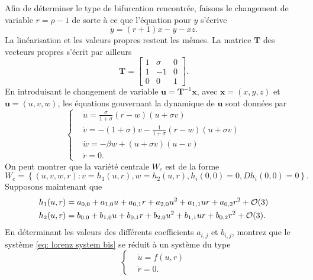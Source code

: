 \documentclass[12pt]{exam}
\begin{document}
\begin{questions}
\begin{parts}
\begin{subparts}
      \subpart[3] Afin de déterminer le type de bifurcation rencontrée, faisons le changement de variable $r = \rho - 1$ de sorte à ce que l'équation pour $y$ s'écrive
      $$
      \dot{y} = (r + 1)x - y - xz.
      $$
      La linéarisation et les valeurs propres restent les mêmes. La matrice $\bm{T}$ des vecteurs propres s'écrit par ailleurs
      $$
      \bm{T}  = \begin{bmatrix}
                    1 & \sigma & 0 \\
                    1 & -1 & 0 \\
                    0 & 0 & 1
                \end{bmatrix}.
      $$
      En introduisant le changement de variable $\bm{u} = \bm{T}^{-1} \bm{x}$, avec $\bm{x} = (x, y, z)$ et $\bm{u} = (u, v, w)$, les équations gouvernant la dynamique de $\bm{u}$ sont données par
      \begin{equation}
        \left\{
        \begin{aligned}
          & \dot{u} = \displaystyle \frac{\sigma}{1+\sigma} \left( r - w \right) \left( u + \sigma v \right) \\
          & \dot{v} = -\left( 1 + \sigma \right)v - \displaystyle \frac{1}{1+\sigma}\left( r - w \right) \left(u + \sigma v \right) \\
          & \dot{w} = -\beta w + \left( u + \sigma v \right) \left( u - v \right) \\
          & \dot{r} = 0.
        \end{aligned}
        \right.
        \label{eq: lorenz system bis}
      \end{equation}
      On peut montrer que la variété centrale $W_c$ est de la forme
      $$
      W_c = \left\{ \left(u, v, w, r \right) : v=h_1(u, r), w = h_2(u, r), h_i(0, 0) = 0, Dh_i(0, 0) = 0 \right\}.
      $$
      Supposons maintenant que
      \begin{equation}
        \begin{aligned}
          h_1(u, r) & = a_{0, 0} + a_{1, 0}u + a_{0, 1}r + a_{2, 0}u^2 + a_{1, 1}ur + a_{0, 2}r^2 + \mathcal{O}(3) \\
          h_2(u, r) & = b_{0, 0} + b_{1, 0}u + b_{0, 1}r + b_{2, 0}u^2 + b_{1, 1}ur + b_{0, 2}r^2 + \mathcal{O}(3).
        \end{aligned}
        \notag
      \end{equation}
      En déterminant les valeurs des différents coefficients $a_{i, j}$ et $b_{i, j}$, montrez que le système \eqref{eq: lorenz system bis} se réduit à un système du type
      \begin{equation}
        \left\{
        \begin{aligned}
          & \dot{u} = f(u, r) \\
          & \dot{r} = 0.
        \end{aligned}
        \right.
        \label{eq: normal form}
      \end{equation}


\end{subparts}
\end{parts}
\end{questions}
\end{document}
